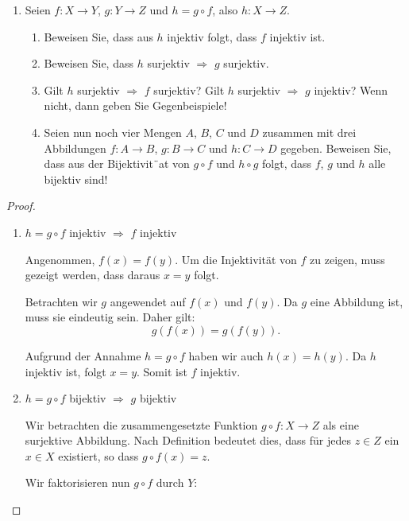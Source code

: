 \documentclass{../problemset}
\begin{document}
\pagebreak

\begin{problem}
\begin{enumerate}
	\item Seien $f: X \to Y$, $g: Y \to Z$ und $h = g \circ f$, also $h: X \to Z$.
	      \begin{enumerate}
		      \item Beweisen Sie, dass aus $h$ injektiv folgt, dass $f$ injektiv ist.
		      \item Beweisen Sie, dass $h$ surjektiv $\Rightarrow$ $g$ surjektiv.
		      \item Gilt $h$ surjektiv $\Rightarrow$ $f$ surjektiv? Gilt $h$ surjektiv $\Rightarrow$ $g$ injektiv? Wenn nicht, dann geben Sie Gegenbeispiele!
		      \item Seien nun noch vier Mengen $A$, $B$, $C$ und $D$ zusammen mit drei Abbildungen $f: A \to B$, $g: B \to C$ und $h: C \to D$ gegeben. Beweisen Sie, dass aus der Bijektivit¨at von $g \circ f$ und $h \circ g$ folgt, dass $f$, $g$ und $h$ alle bijektiv sind!
	      \end{enumerate}

\end{enumerate}

\begin{proof}
	\begin{enumerate}
		\item $h = g \circ f$ injektiv $\Rightarrow$ $f$ injektiv

		      Angenommen, $f(x) = f(y)$. Um die Injektivität von $f$ zu zeigen, muss gezeigt werden, dass daraus $x = y$ folgt.

		      Betrachten wir $g$ angewendet auf $f(x)$ und $f(y)$. Da $g$ eine Abbildung ist, muss sie eindeutig sein. Daher gilt:
		      \[
			      g(f(x)) = g(f(y)).
		      \]

		      Aufgrund der Annahme $h = g \circ f$ haben wir auch $h(x) = h(y)$.
		      Da $h$ injektiv ist, folgt $x = y$. Somit ist $f$ injektiv. \checkmark
		\item $h = g \circ f$ bijektiv $\Rightarrow$ $g$ bijektiv

		      Wir betrachten die zusammengesetzte Funktion \(g \circ f: X \to Z\) als eine surjektive Abbildung. Nach Definition bedeutet dies, dass für jedes \(z \in Z\) ein \(x \in X\) existiert, so dass \(g \circ f(x) = z\).

		      Wir faktorisieren nun \(g \circ f\) durch \(Y\):


\end{enumerate}
\end{proof}
\end{problem}
\end{document}
